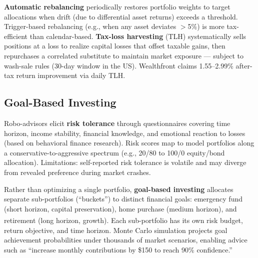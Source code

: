 \begin{tcbitemize}[ skin=sectionraster ]
    \tcbitem[title={Rebalancing and Tax-Loss Harvesting}, raster multicolumn=3]
    \textbf{Automatic rebalancing} periodically restores portfolio weights to target allocations when drift (due to differential asset returns) exceeds a threshold.
    Trigger-based rebalancing (e.g., when any asset deviates $>$5\%) is more tax-efficient than calendar-based.
    \textbf{Tax-loss harvesting} (TLH) systematically sells positions at a loss to realize capital losses that offset taxable gains, then repurchases a correlated substitute to maintain market exposure — subject to wash-sale rules (30-day window in the US).
    Wealthfront claims 1.55--2.99\% after-tax return improvement via daily TLH.

\end{tcbitemize}

\subsection{Goal-Based Investing}

\begin{tcbitemize}[ skin=sectionraster ]

    \tcbitem[title=Risk Profiling and Investor Preferences, raster multicolumn=3]
    Robo-advisors elicit \textbf{risk tolerance} through questionnaires covering time horizon, income stability, financial knowledge, and emotional reaction to losses (based on behavioral finance research).
    Risk scores map to model portfolios along a conservative-to-aggressive spectrum (e.g., 20/80 to 100/0 equity/bond allocation).
    Limitations: self-reported risk tolerance is volatile and may diverge from revealed preference during market crashes.

    \tcbitem[title=Goal-Based Portfolio Modeling, raster multicolumn=3]
    Rather than optimizing a single portfolio, \textbf{goal-based investing} allocates separate sub-portfolios (``buckets'') to distinct financial goals: emergency fund (short horizon, capital preservation), home purchase (medium horizon), and retirement (long horizon, growth)\textsuperscript{\cite[][p.~125]{jansenMachineLearningAlgorithmic2020}}.
    Each sub-portfolio has its own risk budget, return objective, and time horizon.
    Monte Carlo simulation projects goal achievement probabilities under thousands of market scenarios, enabling advice such as ``increase monthly contributions by \$150 to reach 90\% confidence.''

\end{tcbitemize}

